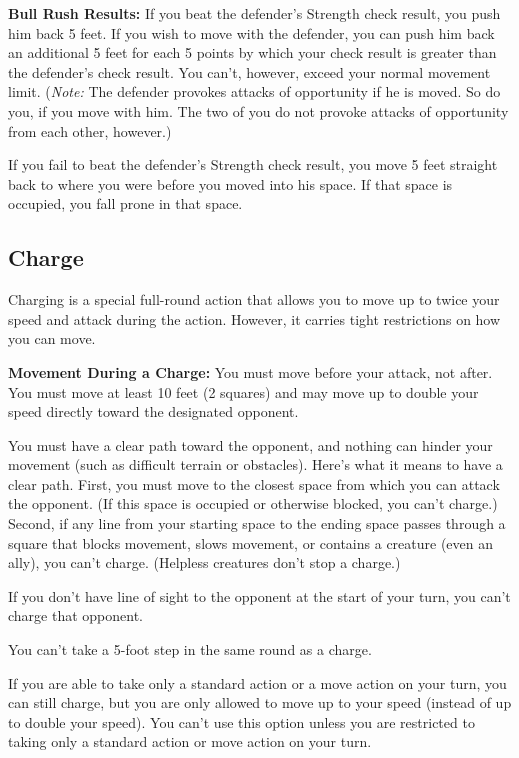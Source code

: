\textbf{Bull Rush Results:} If you beat the defender's Strength check result, you 
push him back 5 feet. If you wish to move with the defender, you can push him back 
an additional 5 feet for each 5 points by which your check result is greater than 
the defender's check result. You can't, however, exceed your normal movement limit. 
(\textit{Note:} The defender provokes attacks of opportunity if he is moved. So 
do you, if you move with him. The two of you do not provoke attacks of opportunity 
from each other, however.)

If you fail to beat the defender's Strength check result, you move 5 feet straight 
back to where you were before you moved into his space. If that space is occupied, 
you fall prone in that space.

\subsection{Charge}

Charging is a special full-round action that allows you to move up to twice your 
speed and attack during the action. However, it carries tight restrictions on how 
you can move.

\textbf{Movement During a Charge:} You must move before your attack, not after. 
You must move at least 10 feet (2 squares) and may move up to double your speed 
directly toward the designated opponent.

You must have a clear path toward the opponent, and nothing can hinder your movement 
(such as difficult terrain or obstacles). Here's what it means to have a clear 
path. First, you must move to the closest space from which you can attack the opponent. 
(If this space is occupied or otherwise blocked, you can't charge.) Second, if 
any line from your starting space to the ending space passes through a square that 
blocks movement, slows movement, or contains a creature (even an ally), you can't 
charge. (Helpless creatures don't stop a charge.)

If you don't have line of sight to the opponent at the start of your turn, you 
can't charge that opponent.

You can't take a 5-foot step in the same round as a charge.

If you are able to take only a standard action or a move action on your turn, you 
can still charge, but you are only allowed to move up to your speed (instead of 
up to double your speed). You can't use this option unless you are restricted to 
taking only a standard action or move action on your turn.

